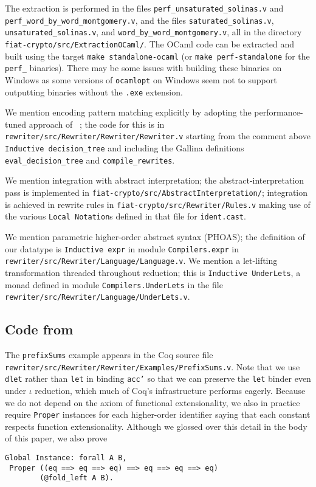 \documentclass[a4paper,USenglish,cleveref,autoref,thm-restate]{lipics-v2021}
\newcommand{\citet}[1]{\usebibentry{#1}{citet}~\cite{#1}}
\begin{document}
\begin{itemize}
    The extraction is performed in the files \texttt{perf\_unsaturated\_solinas.v} and \texttt{perf\_word\_by\_word\_montgomery.v}, and the files \texttt{saturated\_solinas.v}, \texttt{unsaturated\_solinas.v}, and \texttt{word\_by\_word\_montgomery.v}, all in the directory \texttt{fiat-crypto/src/ExtractionOCaml/}.
    The OCaml code can be extracted and built using the target \texttt{make standalone-ocaml} (or \texttt{make perf-standalone} for the \texttt{perf\_} binaries).
    There may be some issues with building these binaries on Windows as some versions of \texttt{ocamlopt} on Windows seem not to support outputting binaries without the \texttt{.exe} extension.
\end{itemize}

We mention encoding pattern matching explicitly by adopting the performance-tuned approach of \citet{maranget2008compiling}; the code for this is in \texttt{rewriter/src/Rewriter/Rewriter/Rewriter.v} starting from the comment above \texttt{Inductive decision_tree} and including the Gallina definitions \texttt{eval_decision_tree} and \texttt{compile_rewrites}.

We mention integration with abstract interpretation; the abstract-interpretation pass is implemented in \texttt{fiat-crypto/src/AbstractInterpretation/}; integration is achieved in rewrite rules in \texttt{fiat-crypto/src/Rewriter/Rules.v} making use of the various \texttt{Local Notation}s defined in that file for \texttt{ident.cast}.

We mention parametric higher-order abstract syntax (PHOAS); the definition of our datatype is \texttt{Inductive expr} in module \texttt{Compilers.expr} in \texttt{rewriter/src/Rewriter/Language/Language.v}.
We mention a let-lifting transformation threaded throughout reduction; this is \texttt{Inductive UnderLets}, a monad defined in module \texttt{Compilers.UnderLets} in the file \texttt{rewriter/src/Rewriter/Language/UnderLets.v}.

\subsection{Code from }

The \texttt{prefixSums} example appears in the Coq source file \texttt{rewriter/src/Rewriter/Rewriter/Examples/PrefixSums.v}.
Note that we use \texttt{dlet} rather than \texttt{let} in binding \texttt{acc'} so that we can preserve the \texttt{let} binder even under $\iota$ reduction, which much of Coq's infrastructure performs eagerly.
Because we do not depend on the axiom of functional extensionality, we also in practice require \texttt{Proper} instances for each higher-order identifier saying that each constant respects function extensionality.
Although we glossed over this detail in the body of this paper, we also prove
\begin{verbatim}
Global Instance: forall A B,
 Proper ((eq ==> eq ==> eq) ==> eq ==> eq ==> eq)
        (@fold_left A B).
\end{verbatim}
\end{document}
